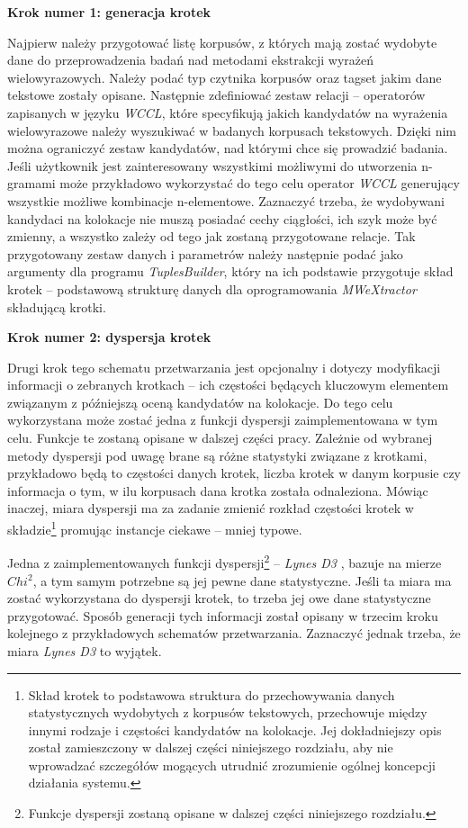 \par
\noindent\textbf{Krok numer 1: generacja krotek}
\par
Najpierw należy przygotować listę korpusów, z których mają zostać wydobyte dane do przeprowadzenia badań nad metodami ekstrakcji wyrażeń wielowyrazowych.
Należy podać typ czytnika korpusów oraz tagset jakim dane tekstowe zostały opisane.
Następnie zdefiniować zestaw relacji -- operatorów zapisanych w języku \emph{WCCL}, które specyfikują jakich kandydatów na wyrażenia wielowyrazowe należy wyszukiwać w badanych korpusach tekstowych.
Dzięki nim można ograniczyć zestaw kandydatów, nad którymi chce się prowadzić badania.
Jeśli użytkownik jest zainteresowany wszystkimi możliwymi do utworzenia n-gramami może przykładowo wykorzystać do tego celu operator \emph{WCCL} generujący wszystkie możliwe kombinacje n-elementowe.
Zaznaczyć trzeba, że wydobywani kandydaci na kolokacje nie muszą posiadać cechy ciągłości, ich szyk może być zmienny, a wszystko zależy od tego jak zostaną przygotowane relacje.
Tak przygotowany zestaw danych i parametrów należy następnie podać jako argumenty dla programu \emph{TuplesBuilder}, który na ich podstawie przygotuje skład krotek -- podstawową strukturę danych dla oprogramowania \emph{MWeXtractor} składującą krotki.

\par
\noindent\textbf{Krok numer 2: dyspersja krotek}
\par
Drugi krok tego schematu przetwarzania jest opcjonalny i dotyczy modyfikacji informacji o zebranych krotkach -- ich częstości będących kluczowym elementem związanym z późniejszą oceną kandydatów na kolokacje.
Do tego celu wykorzystana może zostać jedna z funkcji dyspersji zaimplementowana w tym celu.
Funkcje te zostaną opisane w dalszej części pracy.
Zależnie od wybranej metody dyspersji pod uwagę brane są różne statystyki związane z krotkami, przykładowo będą to częstości danych krotek, liczba krotek w danym korpusie czy informacja o tym, w ilu korpusach dana krotka została odnaleziona.
Mówiąc inaczej, miara dyspersji ma za zadanie zmienić rozkład częstości krotek w składzie\footnote{Skład krotek to podstawowa struktura do przechowywania danych statystycznych wydobytych z korpusów tekstowych, przechowuje między innymi rodzaje i częstości kandydatów na kolokacje. Jej dokładniejszy opis został zamieszczony w dalszej części niniejszego rozdziału, aby nie wprowadzać szczegółów mogących utrudnić zrozumienie ogólnej koncepcji działania systemu.} promując instancje ciekawe -- mniej typowe.
\par
Jedna z zaimplementowanych funkcji dyspersji\footnote{Funkcje dyspersji zostaną opisane w dalszej części niniejszego rozdziału.} -- \emph{Lynes D3} \cite{dispersions}, bazuje na mierze $ Chi^{2} $, a tym samym potrzebne są jej pewne dane statystyczne.
Jeśli ta miara ma zostać wykorzystana do dyspersji krotek, to trzeba jej owe dane statystyczne przygotować.
Sposób generacji tych informacji został opisany w trzecim kroku kolejnego z przykładowych schematów przetwarzania.
Zaznaczyć jednak trzeba, że miara \emph{Lynes D3} to wyjątek.

